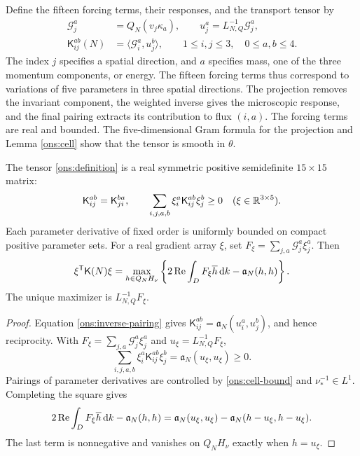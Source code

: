 Define the fifteen forcing terms, their responses, and the transport tensor by
\begin{equation}\label{ons:definition}
 \begin{aligned}
 \mathcal G_j^a&=Q_N(v_j\kappa_a),\qquad
 u_j^a=L_{N,Q}^{-1}\mathcal G_j^a,\\
 \mathsf K_{ij}^{ab}(N)&=\langle\mathcal G_i^a,u_j^b\rangle,
 \qquad 1\le i,j\le3,\quad0\le a,b\le4.
 \end{aligned}
\end{equation}
The index $j$ specifies a spatial direction, and $a$ specifies mass,
one of the three momentum components, or energy. The fifteen forcing terms
thus correspond to variations of five parameters in three spatial
directions. The projection removes the invariant component, the weighted
inverse gives the microscopic response, and the final pairing extracts
its contribution to flux $(i,a)$. The forcing terms are real and bounded.
The five-dimensional Gram formula for the projection and
Lemma \ref{ons:cell} show that the tensor is smooth in $\theta$.

\begin{proposition}\label{ons:tensor}
 The tensor \eqref{ons:definition} is a real symmetric positive
 semidefinite $15\times15$ matrix:
 \begin{equation}\label{ons:reciprocity}
 \mathsf K_{ij}^{ab}=\mathsf K_{ji}^{ba},\qquad
 \sum_{i,j,a,b}\xi_i^a\mathsf K_{ij}^{ab}\xi_j^b\ge0
 \quad(\xi\in\mathbb R^{3\times5}).
 \end{equation}
 Each parameter derivative of fixed order is uniformly bounded on
 compact positive parameter sets. For a real gradient array $\xi$, set
 $F_\xi=\sum_{j,a}\mathcal G_j^a\xi_j^a$. Then
 \begin{equation}\label{ons:variational}
 \xi^{\mathsf T}\mathsf K(N)\xi
 =\max_{h\in Q_NH_\nu}
       \left\{2\operatorname{Re}\int_DF_\xi\overline h\,\mathrm d k
                               -\mathfrak a_N(h,h)\right\}.
 \end{equation}
 The unique maximizer is $L_{N,Q}^{-1}F_\xi$.
\end{proposition}
\begin{proof}
 Equation \eqref{ons:inverse-pairing} gives
 $\mathsf K_{ij}^{ab}=\mathfrak a_N(u_i^a,u_j^b)$, and hence reciprocity.
 With $F_\xi=\sum_{j,a}\mathcal G_j^a\xi_j^a$ and
 $u_\xi=L_{N,Q}^{-1}F_\xi$,
 \begin{equation}\label{ons:quadratic-form}
 \sum_{i,j,a,b}\xi_i^a\mathsf K_{ij}^{ab}\xi_j^b
       =\mathfrak a_N(u_\xi,u_\xi)\ge0.
 \end{equation}
 Pairings of parameter derivatives are controlled by
 \eqref{ons:cell-bound} and $\nu_*^{-1}\in L^1$.
 Completing the square gives
 \[
 2\operatorname{Re}\int_DF_\xi\overline h\,\mathrm d k-\mathfrak a_N(h,h)
 =\mathfrak a_N(u_\xi,u_\xi)
                -\mathfrak a_N(h-u_\xi,h-u_\xi).
 \]
 The last term is nonnegative and vanishes on $Q_NH_\nu$ exactly when
 $h=u_\xi$.
\end{proof}

